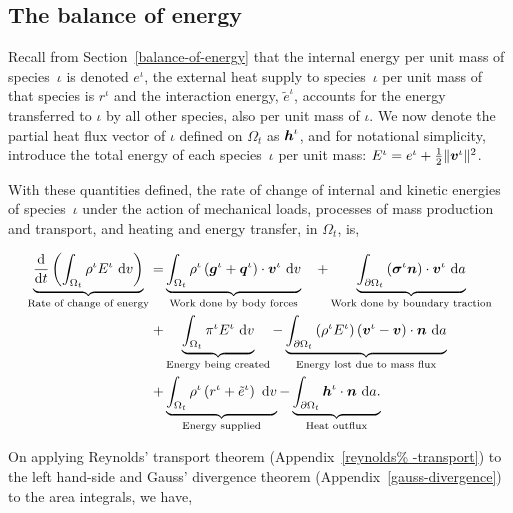 \subsection{The balance of energy}
\label{eu-balance-of-energy}

Recall from Section~\ref{balance-of-energy} that the internal energy
per unit mass of species~$\iota$ is denoted $e^\iota$, the external
heat supply to species~$\iota$ per unit mass of that species is
$r^\iota$ and the interaction energy, $\tilde{e}^\iota$, accounts for
the energy transferred to $\iota$ by all other species, also per unit
mass of $\iota$. We now denote the partial heat flux vector of $\iota$
defined on $\Omega_{t}$ as $\mbox{\boldmath$ h$}^\iota$, and for notational simplicity,
introduce the total energy of each species~$\iota$ per unit mass:
$E^{\iota} = e^\iota + \frac{1}{2} \Vert\mbox{\boldmath$ v$}^\iota\Vert^2$.

With these quantities defined, the rate of change of internal and
kinetic energies of species~$\iota$ under the action of mechanical
loads, processes of mass production and transport, and heating and
energy transfer, in $\Omega_{t}$, is,

\begin{equation}
\begin{split}
\underbrace{\frac{\mathrm{d}}{\mathrm{d}t}\left(\int_{\Omega_{t}}
  \rho^{\iota} E^{\iota}\ \mathrm{d}v \right)}_{\text{Rate of change
    of energy}} = & \underbrace{\int_{\Omega_{t}} \rho^{\iota}
  \left(\mbox{\boldmath$ g$}^{\iota} +
  \mbox{\boldmath$ q$}^{\iota}\right)\cdot\mbox{\boldmath$ v$}^{\iota}\ \mathrm{d}v}_{\text{Work done by
    body forces}}\quad + \underbrace{\int_{\partial \Omega_{t}}
  \left(\mbox{\boldmath$\sigma$}^{\iota}\mbox{\boldmath$ n$}\right)
  \cdot\mbox{\boldmath$ v$}^{\iota}\ \mathrm{d}a}_{\text{Work done by boundary
    traction}}\\ + & \underbrace{\int_{\Omega_{t}}
  \pi^{\iota}E^{\iota}\ \mathrm{d}v}_{\text{Energy being created}} -
\underbrace{\int_{\partial \Omega_{t}} \left(\rho^{\iota} E^{\iota}
  \right) \left(\mbox{\boldmath$ v$}^{\iota} - \mbox{\boldmath$ v$}\right) \cdot
  \mbox{\boldmath$ n$}\ \mathrm{d}a}_{\text{Energy lost due to mass flux}} \\ +
&\underbrace{\int_{\Omega_{t}} \rho^{\iota} \left(r^{\iota} +
  \tilde{e}^{\iota} \right)\ \mathrm{d}v}_{\text{Energy supplied}} -
\underbrace{\int_{\partial \Omega_{t}}
  \mbox{\boldmath$ h$}^{\iota}\cdot\mbox{\boldmath$ n$}\ \mathrm{d}a.}_{\text{Heat outflux}}
\end{split}
\label{eu-globalbalanceofenergy}
\end{equation}

On applying Reynolds' transport theorem (Appendix~\ref{reynolds%
  -transport}) to the left hand-side and Gauss' divergence theorem
(Appendix~\ref{gauss-divergence}) to the area integrals, we have,

